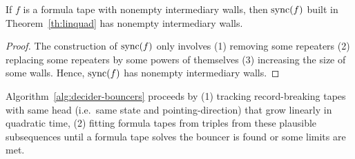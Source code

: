 \begin{lemma}\label{lem:linquad-intermediary-walls}
    If $f$ is a formula tape with nonempty intermediary walls, then $\operatorname{sync}(f)$ built in Theorem~\ref{th:linquad} has nonempty intermediary walls.
\end{lemma}
\begin{proof}
    The construction of $\operatorname{sync}(f)$ only involves (1) removing some repeaters (2) replacing some repeaters by some powers of themselves (3) increasing the size of some walls. Hence, $\operatorname{sync}(f)$ has nonempty intermediary walls.
\end{proof}

Algorithm~\ref{alg:decider-bouncers} proceeds by (1) tracking record-breaking tapes with same head (i.e.\ same state and pointing-direction) that grow linearly in quadratic time, (2) fitting formula tapes from triples from these plausible subsequences until a formula tape solves the bouncer is found or some limits are met.







